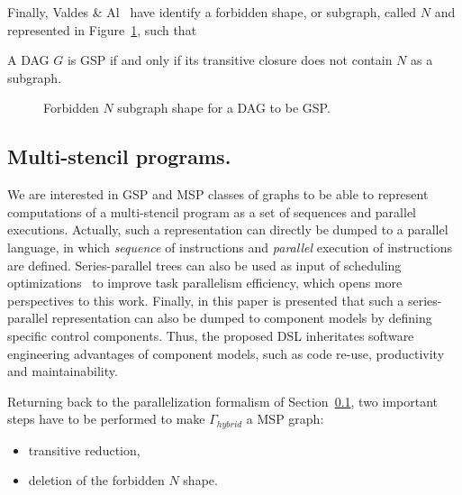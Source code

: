 Finally, Valdes \& Al~\cite{Valdes:1979:RSP:800135.804393} have identify a forbidden shape, or subgraph, called $N$ and represented in Figure~\ref{fig:n}, such that 

\begin{myth}
A DAG $G$ is GSP if and only if its transitive closure does not contain $N$ as a subgraph.
\end{myth}

\begin{figure}[h!]
\begin{center}
  \caption{Forbidden $N$ subgraph shape for a DAG to be GSP.}
  \label{fig:n}
\end{center}
\end{figure}

\subsection{Multi-stencil programs.}
We are interested in GSP and MSP classes of graphs to be able to represent computations of a multi-stencil program as a set of sequences and parallel executions. Actually, such a representation can directly be dumped to a parallel language, in which \emph{sequence} of instructions and \emph{parallel} execution of instructions are defined. Series-parallel trees can also be used as input of scheduling optimizations~\cite{Finta1996323,Wang20082684} to improve task parallelism efficiency, which opens more perspectives to this work. Finally, in this paper is presented that such a series-parallel representation can also be dumped to component models by defining specific control components. Thus, the proposed DSL inheritates software engineering advantages of component models, such as code re-use, productivity and maintainability.

Returning back to the parallelization formalism of Section~\ref{}, two important steps have to be performed to make $\Gamma_{hybrid}$ a MSP graph:
\begin{itemize}
\item transitive reduction,
\item deletion of the forbidden $N$ shape.
\end{itemize}

